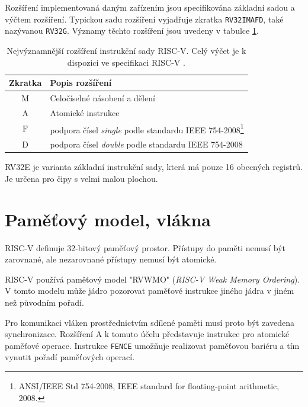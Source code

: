 Rozšíření implementovaná daným zařízením jsou specifikována základní sadou a výčtem rozšíření.
Typickou sadu rozšíření vyjadřuje zkratka \texttt{RV32IMAFD}, také nazývanou \texttt{RV32G}.
Významy těchto rozšíření jsou uvedeny v tabulce \ref{table:extensions}.

\begin{table}[ht]
\centering
\caption{Nejvýznamnější rozšíření instrukční sady RISC-V. Celý výčet je k dispozici ve specifikaci RISC-V \cite{riscvspec}.}
\begin{tabular}{|c|l|}
\hline
Zkratka  & Popis rozšíření             \\ \hline\hline
M          & Celočíselné násobení a dělení     \\ \hline
A         & Atomické instrukce     \\ \hline
F         & podpora čísel \emph{single} podle standardu IEEE 754-2008\footnote{ANSI/IEEE Std 754-2008, IEEE standard for floating-point arithmetic, 2008.}     \\ \hline
D         & podpora čísel \emph{double} podle standardu IEEE 754-2008     \\ \hline
\end{tabular}
\label{table:extensions}
\end{table}


RV32E je varianta základní instrukční sady, která má pouze 16 obecných registrů.
Je určena pro čipy s velmi malou plochou.

\section{Paměťový model, vlákna}

RISC-V definuje 32-bitový paměťový prostor.
Přístupy do paměti nemusí být zarovnané, ale nezarovnané přístupy nemusí být atomické.

RISC-V používá paměťový model "RVWMO" (\emph{RISC-V Weak Memory Ordering}).
V tomto modelu může jádro pozorovat paměťové instrukce jiného jádra v jiném než původním pořadí.

Pro komunikaci vláken prostřednictvím sdílené paměti musí proto být zavedena synchronizace.
Rozšíření A k tomuto účelu představuje instrukce pro atomické paměťové operace.
Instrukce \texttt{FENCE} umožňuje realizovat paměťovou bariéru a tím vynutit pořadí paměťových operací.

